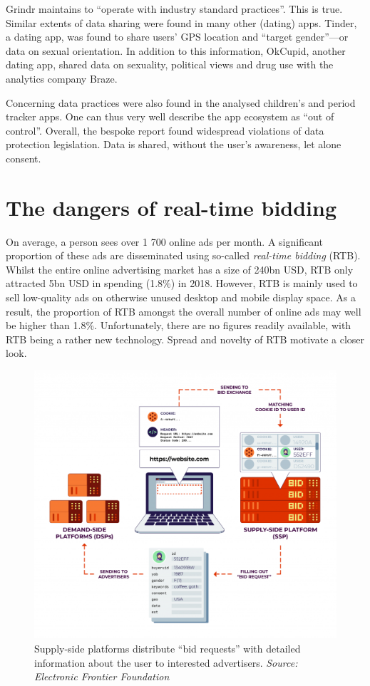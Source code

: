 \documentclass[
]{book}
\begin{document}
Grindr maintains to ``operate with industry standard practices''. This is true. Similar extents of data sharing were found in many other (dating) apps. Tinder, a dating app, was found to share users' GPS location and ``target gender''---or data on sexual orientation. In addition to this information, OkCupid, another dating app, shared data on sexuality, political views and drug use with the analytics company Braze.

Concerning data practices were also found in the analysed children's and period tracker apps. One can thus very well describe the app ecosystem as ``out of control''. Overall, the bespoke report found widespread violations of data protection legislation. Data is shared, without the user's awareness, let alone consent.

\hypertarget{the-dangers-of-real-time-bidding}{%
\section{The dangers of real-time bidding}\label{the-dangers-of-real-time-bidding}}

On average, a person sees over 1 700 online ads per month. A significant proportion of these ads are disseminated using so-called \emph{real-time bidding} (RTB). Whilst the entire online advertising market has a size of 240bn USD, RTB only attracted 5bn USD in spending (1.8\%) in 2018. However, RTB is mainly used to sell low-quality ads on otherwise unused desktop and mobile display space. As a result, the proportion of RTB amongst the overall number of online ads may well be higher than 1.8\%. Unfortunately, there are no figures readily available, with RTB being a rather new technology. Spread and novelty of RTB motivate a closer look.

\begin{figure}
\centering
\includegraphics{images/real-time-bidding.png}
\caption{Supply-side platforms distribute ``bid requests'' with detailed information about the user to interested advertisers. \emph{Source: Electronic Frontier Foundation}}
\end{figure}
\end{document}
